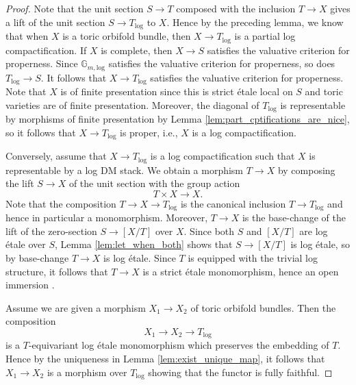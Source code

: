 \documentclass[11pt]{amsart}
\theoremstyle{definition}
\theoremstyle{remark}
\def\log{\mathrm{log}}
\begin{document}
\begin{proof}
	Note that the unit section $S\to T$ composed with the inclusion
	$T\to X$ gives a lift of the unit section $S\to T_{\log}$ to
	$X$. Hence by the preceding lemma, we know that when $X$ is a
	toric orbifold bundle, then $X\to T_{\log}$ is a partial log compactification.
	If $X$ is complete, then $X\to S$ satisfies the valuative criterion for properness.
	Since $\mathbb{G}_{m,\log}$ satisfies the valuative criterion for properness,
	so does $T_{\log}\to S$. It follows that $X\to T_{\log}$ satisfies the valuative
	criterion for properness. Note that $X$ is of finite presentation
	since this is strict étale local on $S$ and toric varieties are of finite presentation. Moreover, the diagonal
	of $T_{\log}$ is representable by morphisms of finite presentation by Lemma
	\ref{lem:part_cptifications_are_nice}, so it follows that $X\to T_{\log}$ is proper,
	i.e., $X$ is a log compactification.

	Conversely, assume that $X\to T_{\log}$ is a log compactification such
	that $X$ is representable by a log DM stack. We obtain
	a morphism $T\to X$ by composing the lift $S\to X$ of the
	unit section with the group action
	$$T\times X\to X.$$
	Note that the composition $T\to X\to T_{\log}$ is the canonical inclusion
	$T\to T_{\log}$ and hence in particular a monomorphism. Moreover,
	$T\to X$ is the base-change of the lift of the zero-section
	$S\to [X/T]$ over $X$. Since both $S$ and $[X/T]$ are log étale
	over $S$, Lemma \ref{lem:let_when_both} shows that
	$S\to [X/T]$ is log étale, so by base-change
	$T\to X$ is log étale. Since $T$ is equipped with the trivial
	log structure, it follows that $T\to X$ is a strict étale
	monomorphism, hence an open immersion \cite[Tag 025G]{stacks-project}.

	Assume we are given a morphism $X_1\to X_2$ of toric orbifold bundles.
	Then the composition
	$$X_1\to X_2\to T_{\log}$$
	is a $T$-equivariant
	log étale monomorphism which preserves the embedding
	of $T$. Hence by the uniqueness in Lemma \ref{lem:exist_unique_map},
	it follows that $X_1\to X_2$ is a morphism over $T_{\log}$ showing
	that the functor is fully faithful.


\end{proof}
\end{document}
